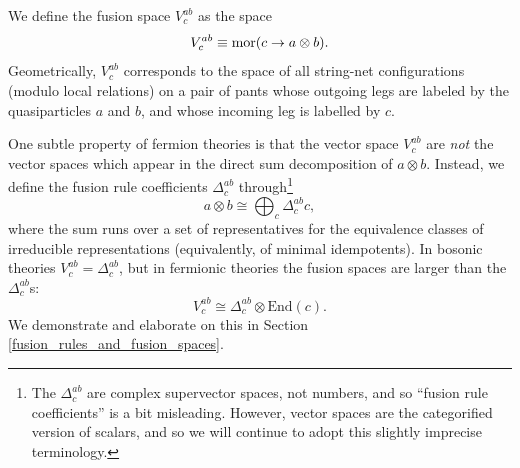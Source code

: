 \documentclass[12pt,a4paper]{article}
\newcounter{arrow}
\newcommand{\tp}{\otimes}
\newcommand{\ra}{\rightarrow}
\newcommand\be            {\begin{equation}}
\newcommand\ee            {\end{equation}}
\newcommand{\End}{\text{End}}
\newcommand{\dave}[1]{{\color{ao(english)}\footnotesize{(DA) #1}}}
\begin{document}
We define the fusion space $V^{ab}_c$ as the space
\be V^{ab}_c \equiv {\rm mor}(c \ra a \tp b).\ee
Geometrically, $V^{ab}_c$ corresponds to the space of all string-net configurations (modulo local relations) on a pair of pants whose outgoing legs are labeled by the quasiparticles $a$ and $b$, and whose incoming leg is labelled by $c$. 

One subtle property of fermion theories is that the vector space $V^{ab}_c$ are {\it not} the vector spaces which appear in the direct sum decomposition of $a\tp b$. 
Instead, we define the fusion rule coefficients $\Delta^{ab}_c$ through\footnote{The $\Delta^{ab}_c$ are complex supervector spaces, not numbers, and so ``fusion rule coefficients'' is a bit misleading. However, vector spaces are the categorified version of scalars, and so we will continue to adopt this slightly imprecise terminology.}
\be \label{fusion_coeffs_defn} 
	a \tp b \cong \bigoplus_c \Delta^{ab}_ c c,
\ee
where the sum runs over a set of representatives for the equivalence classes of irreducible representations (equivalently, of minimal idempotents). 
In bosonic theories $V^{ab}_c = \Delta^{ab}_c$, but in fermionic theories the fusion spaces are larger than the $\Delta^{ab}_c$s:
\be V^{ab}_c \cong \Delta^{ab}_c \tp \End(c).\ee
We demonstrate and elaborate on this in Section \ref{fusion_rules_and_fusion_spaces}. 



\end{document}

